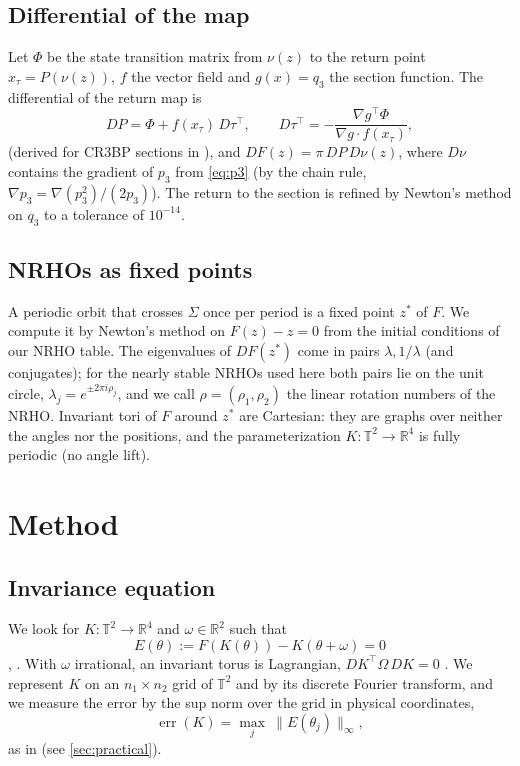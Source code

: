 \documentclass[11pt]{article}
\newcommand{\T}{\mathbb{T}}
\newcommand{\R}{\mathbb{R}}
\DeclareMathOperator{\err}{err}
\begin{document}
\subsection{Differential of the map}
Let $\Phi$ be the state transition matrix from $\nu(z)$ to the return point $x_\tau = P(\nu(z))$,
$f$ the vector field and $g(x)=q_3$ the section function. The differential of the return map is
\begin{equation}\label{eq:DP}
DP = \Phi + f(x_\tau)\, D\tau^{\!\top}, \qquad
D\tau^{\!\top} = -\frac{\nabla g^{\top}\Phi}{\nabla g\cdot f(x_\tau)},
\end{equation}
\cite[Sec.~7, eqs.~(40) and (42), pp.~17--18]{wilczak2007lohner} (derived for CR3BP sections in
\cite[App.~E.3]{blanchard2024thesis}), and
$DF(z) = \pi\, DP\, D\nu(z)$, where $D\nu$ contains the gradient of $p_3$ from \eqref{eq:p3}
(by the chain rule, $\nabla p_3 = \nabla(p_3^2)/(2p_3)$). The return to the section is refined by
Newton's method on $q_3$ to a tolerance of $10^{-14}$.

\subsection{NRHOs as fixed points}
A periodic orbit that crosses $\Sigma$ once per period is a fixed point $z^*$ of $F$. We compute it
by Newton's method on $F(z)-z=0$ from the initial conditions of our NRHO table. The eigenvalues of
$DF(z^*)$ come in pairs $\lambda,1/\lambda$ (and conjugates); for the nearly stable NRHOs used
here both pairs lie on the unit circle, $\lambda_j = e^{\pm 2\pi i \rho_j}$, and we call
$\rho = (\rho_1,\rho_2)$ the linear rotation numbers of the NRHO. Invariant tori of $F$ around
$z^*$ are Cartesian: they are graphs over neither the angles nor the positions, and the
parameterization $K:\T^2\to\R^4$ is fully periodic (no angle lift).

\section{Method}\label{sec:method}

\subsection{Invariance equation}
We look for $K:\T^2\to\R^4$ and $\omega\in\R^2$ such that
\begin{equation}\label{eq:inv}
E(\theta) := F(K(\theta)) - K(\theta+\omega) = 0
\end{equation}
\cite[Sec.~2.1, eq.~(4), p.~5]{figueras2017rigorous}, \cite{fontich2009kam}. With $\omega$
irrational, an invariant torus is Lagrangian, $DK^\top \Omega\, DK = 0$
\cite{figueras2017rigorous}. We represent $K$ on an $n_1\times n_2$ grid of $\T^2$ and by its
discrete Fourier transform, and we measure the error by the sup norm over the grid in physical
coordinates,
\begin{equation}\label{eq:err}
\err(K) = \max_{j}\ \| E(\theta_j) \|_\infty ,
\end{equation}
as in \cite[Alg.~3.6.1, p.~29]{haromondelo2021flow} (see \cref{sec:practical}).
\end{document}
